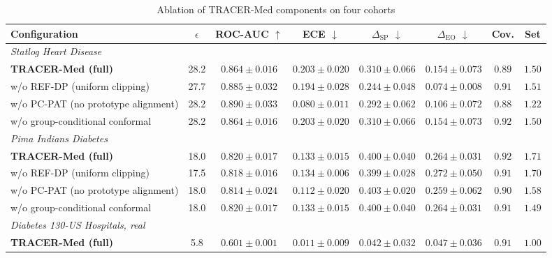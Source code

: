 \documentclass[pdflatex,sn-vancouver-num,referee,lineno]{sn-jnl}
\theoremstyle{thmstyleone}
\theoremstyle{thmstylethree}
\begin{document}
\begin{table}
\centering
\caption{Ablation of TRACER-Med components on four cohorts}
\label{tab:ablation}
\begingroup\scriptsize\setlength{\tabcolsep}{2.5pt}
\begin{tabular}{lccccccc}
\toprule
\textbf{Configuration} & $\epsilon$ & \textbf{ROC-AUC} $\uparrow$ & \textbf{ECE} $\downarrow$ & $\Delta_{\text{SP}}$ $\downarrow$ & $\Delta_{\text{EO}}$ $\downarrow$ & \textbf{Cov.} & \textbf{Set} \\
\midrule
\multicolumn{8}{l}{\emph{Statlog Heart Disease}} \\
\textbf{TRACER-Med (full)} & 28.2 & $0.864 \pm 0.016$ & $0.203 \pm 0.020$ & $0.310 \pm 0.066$ & $0.154 \pm 0.073$ & $0.89$ & $1.50$ \\
\quad w/o REF-DP (uniform clipping) & 27.7 & $0.885 \pm 0.032$ & $0.194 \pm 0.028$ & $\mathbf{0.244} \pm \mathbf{0.048}$ & $\mathbf{0.074} \pm \mathbf{0.008}$ & $0.91$ & $1.51$ \\
\quad w/o PC-PAT (no prototype alignment) & 28.2 & $\mathbf{0.890} \pm \mathbf{0.033}$ & $\mathbf{0.080} \pm \mathbf{0.011}$ & $0.292 \pm 0.062$ & $0.106 \pm 0.072$ & $0.88$ & $1.22$ \\
\quad w/o group-conditional conformal & 28.2 & $0.864 \pm 0.016$ & $0.203 \pm 0.020$ & $0.310 \pm 0.066$ & $0.154 \pm 0.073$ & $0.92$ & $1.50$ \\
\midrule
\multicolumn{8}{l}{\emph{Pima Indians Diabetes}} \\
\textbf{TRACER-Med (full)} & 18.0 & $\mathbf{0.820} \pm \mathbf{0.017}$ & $0.133 \pm 0.015$ & $0.400 \pm 0.040$ & $0.264 \pm 0.031$ & $0.92$ & $1.71$ \\
\quad w/o REF-DP (uniform clipping) & 17.5 & $0.818 \pm 0.016$ & $0.134 \pm 0.006$ & $\mathbf{0.399} \pm \mathbf{0.028}$ & $0.272 \pm 0.050$ & $0.91$ & $1.70$ \\
\quad w/o PC-PAT (no prototype alignment) & 18.0 & $0.814 \pm 0.024$ & $\mathbf{0.112} \pm \mathbf{0.020}$ & $0.403 \pm 0.020$ & $\mathbf{0.259} \pm \mathbf{0.062}$ & $0.90$ & $1.58$ \\
\quad w/o group-conditional conformal & 18.0 & $\mathbf{0.820} \pm \mathbf{0.017}$ & $0.133 \pm 0.015$ & $0.400 \pm 0.040$ & $0.264 \pm 0.031$ & $0.91$ & $1.49$ \\
\midrule
\multicolumn{8}{l}{\emph{Diabetes 130-US Hospitals, real}} \\
\textbf{TRACER-Med (full)} & 5.8 & $0.601 \pm 0.001$ & $\mathbf{0.011} \pm \mathbf{0.009}$ & $0.042 \pm 0.032$ & $\mathbf{0.047} \pm \mathbf{0.036}$ & $0.91$ & $1.00$ \\

\end{tabular}
\end{table}
\end{document}
